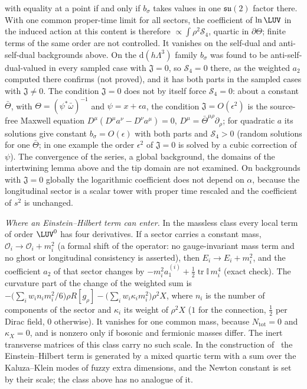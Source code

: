 with equality at a point if and only if \(b_\sigma\) takes values in one \(\mathfrak{su}(2)\) factor there. With one common proper-time limit for all sectors, the coefficient of \(\ln\LUV\) in the induced action at this content is therefore \(\propto\int\rho^2\mathcal S_4\), quartic in \(\partial\Theta\); finite terms of the same order are not controlled. It vanishes on the self-dual and anti-self-dual backgrounds above. On the \(\mathrm d(h\Lambda^3)\) family \(b_\sigma\) was found to be anti-self-dual-valued in every sampled case with \(\mathfrak J=0\), so \(\mathcal S_4=0\) there, as the weighted \(a_2\) computed there confirms (not proved), and it has both parts in the sampled cases with \(\mathfrak J\ne0\). The condition \(\mathfrak J=0\) does not by itself force \(\mathcal S_4=0\): about a constant \(\bar\Theta\), with \(\Theta=(\psi^*\bar\omega)^{-1}\) and \(\psi=x+\epsilon a\), the condition \(\mathfrak J=O(\epsilon^2)\) is the source-free Maxwell equation \(D^\mu(D^\mu a^\nu-D^\nu a^\mu)=0\), \(D^\mu=\bar\Theta^{\mu\rho}\partial_\rho\); for quadratic \(a\) its solutions give constant \(b_\sigma=O(\epsilon)\) with both parts and \(\mathcal S_4>0\) (random solutions for one \(\bar\Theta\); in one example the order \(\epsilon^2\) of \(\mathfrak J=0\) is solved by a cubic correction of \(\psi\)). The convergence of the series, a global background, the domains of the intertwining lemma above and the tip domain are not examined. On backgrounds with \(\mathfrak J=0\) globally the logarithmic coefficient does not depend on \(\alpha\), because the longitudinal sector is a scalar tower with proper time rescaled and the coefficient of \(s^2\) is unchanged.

\emph{Where an Einstein--Hilbert term can enter.} In the massless class every local term of order \(\LUV^0\) has four derivatives. If a sector carries a constant mass, \(\mathcal O_i\to\mathcal O_i+m_i^2\) (a formal shift of the operator: no gauge-invariant mass term and no ghost or longitudinal consistency is asserted), then \(E_i\to E_i+m_i^2\), and the coefficient \(a_2\) of that sector changes by \(-m_i^2a_1^{(i)}+\tfrac12\operatorname{tr}\mathbb I\,m_i^4\) (exact check). The curvature part of the change of the weighted sum is \(-\bigl(\sum_iw_in_im_i^2/6\bigr)\rho R[g_\rho]-\bigl(\sum_iw_i\kappa_im_i^2\bigr)\rho^2X\), where \(n_i\) is the number of components of the sector and \(\kappa_i\) its weight of \(\rho^2X\) (\(1\) for the connection, \(\tfrac12\) per Dirac field, \(0\) otherwise). It vanishes for one common mass, because \(N_{\mathrm{tot}}=0\) and \(\kappa_X=0\), and is nonzero only if bosonic and fermionic masses differ. The inert transverse matrices of this class carry no such scale. In the construction of~\cite{Steinacker2023} the Einstein--Hilbert term is generated by a mixed quartic term with a sum over the Kaluza--Klein modes of fuzzy extra dimensions, and the Newton constant is set by their scale; the class above has no analogue of it.

